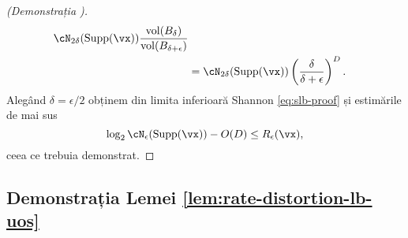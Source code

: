 \documentclass[../../book-main_ro.tex]{subfiles}
\begin{document}
\begin{proof}[(Demonstrația )]
\begin{align}
        \cN_{2\delta}(\Supp(\vx))
        \frac{
            \volume(B_{\delta})
        }
        {
            \volume(B_{\delta + \epsilon})
        }
        \\
        &=
        \cN_{2\delta}(\Supp(\vx))
        \left(
            \frac{
                \delta
            } 
            {
                \delta + \epsilon
            }
        \right)^D.
    \end{align}
    Alegând $\delta = \epsilon / 2$ obținem din limita inferioară Shannon
    \eqref{eq:slb-proof} și estimările de mai sus
    \begin{equation}
        \log_2 \cN_{\epsilon}(\Supp(\vx))
        - O(D)
        \leq
        R_{\epsilon}(\vx),
    \end{equation}
    ceea ce trebuia demonstrat.

\end{proof}



\subsection{Demonstrația Lemei \ref{lem:rate-distortion-lb-uos}}\label{sec:app-rate-dist-deferred-proofs}
\end{document}
